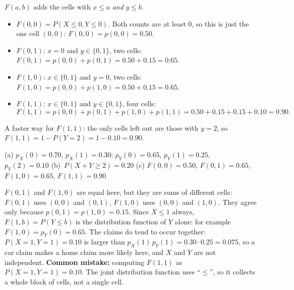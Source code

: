 \begin{solution}
	 $F(a,b)$ adds the cells with $x\le a$ \emph{and} $y\le b$.
	\begin{itemize}
		\item $F(0,0)=P(X\le0,Y\le0)$. Both counts are at least $0$, so this is
		      just the one cell $(0,0)$: $F(0,0)=p(0,0)=0.50$.
		\item $F(0,1)$: $x=0$ and $y\in\{0,1\}$, two cells:
		      $F(0,1)=p(0,0)+p(0,1)=0.50+0.15=0.65$.
		\item $F(1,0)$: $x\in\{0,1\}$ and $y=0$, two cells:
		      $F(1,0)=p(0,0)+p(1,0)=0.50+0.15=0.65$.
		\item $F(1,1)$: $x\in\{0,1\}$ and $y\in\{0,1\}$, four cells:
		      \[ F(1,1)=p(0,0)+p(0,1)+p(1,0)+p(1,1)=0.50+0.15+0.15+0.10=0.90. \]
	\end{itemize}
	A faster way for $F(1,1)$: the only cells left out are those with $y=2$,
	so $F(1,1)=1-P(Y=2)=1-0.10=0.90$.

	\begin{answer}
		(a) ${p_X(0)=0.70}$, ${p_X(1)=0.30}$; ${p_Y(0)=0.65}$, ${p_Y(1)=0.25}$,
		${p_Y(2)=0.10}$ \quad
		(b)~${P(X+Y\ge2)=0.20}$ \quad
		(c) ${F(0,0)=0.50}$, ${F(0,1)=0.65}$, ${F(1,0)=0.65}$, ${F(1,1)=0.90}$
	\end{answer}
	\begin{remark}
		$F(0,1)$ and $F(1,0)$ are equal here, but they are sums of different
		cells: $F(0,1)$ uses $(0,0)$ and $(0,1)$, $F(1,0)$ uses $(0,0)$ and
		$(1,0)$. They agree only because $p(0,1)=p(1,0)=0.15$.
		Since $X\le1$ always, $F(1,b)=P(Y\le b)$ is the distribution function
		of $Y$ alone: for example $F(1,0)=p_Y(0)=0.65$.
		The claims do tend to occur together:
		$P(X=1,Y=1)=0.10$ is larger than $p_X(1)\,p_Y(1)=0.30\cdot0.25=0.075$,
		so a car claim makes a home claim more likely here, and $X$ and $Y$ are
		not independent.
		\textbf{Common mistake:} computing $F(1,1)$ as $P(X=1,Y=1)=0.10$. The
		joint distribution function uses ``$\le$'', so it collects a whole
		block of cells, not a single cell.
	\end{remark}
\end{solution}
